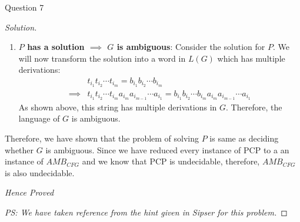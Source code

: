 \begin{solution}{Question 7}
\begin{proof}[Solution]
\begin{enumerate}
            \item \textbf{$P$ has a solution $\implies$ $G$ is ambiguous}: Consider the solution for $P$. We will now transform the solution into a word in $L(G)$ which has multiple derivations:
            \begin{equation}
                \begin{split}
                    &t_{i_1}t_{i_2}\cdots t_{i_m} = b_{i_1}b_{i_2}\cdots b_{i_m}\\
                    \implies &t_{i_1}t_{i_2}\cdots t_{i_m}a_{i_m}a_{i_{m-1}}\cdots a_{i_1} = b_{i_1}b_{i_2}\cdots b_{i_m}a_{i_m}a_{i_{m-1}}\cdots a_{i_1}
                \end{split}
            \end{equation}
            As shown above, this string has multiple derivations in $G$. Therefore, the language of $G$ is ambiguous.
        \end{enumerate}
        Therefore, we have shown that the problem of solving $P$ is same as deciding whether $G$ is ambiguous. Since we have reduced every instance of PCP to a an instance of $AMB_{CFG}$ and we know that PCP is undecidable, therefore, $AMB_{CFG}$ is also undecidable.
        \begin{center}
        \textit{Hence Proved}
        \end{center}
        \textit{PS: We have taken reference from the hint given in Sipser for this problem.}
    \end{proof}
\end{solution}
